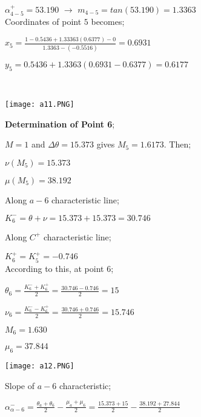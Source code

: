 \begin{appendices}
\begin{minipage}{0.65\textwidth}
${\alpha}_{4-5}^{+} = 53.190 $ $\rightarrow$ $m_{4-5} = tan(53.190) = 1.3363$\\

Coordinates of point $5$ becomes;\\

{\color{magenta}
	$x_5 = \frac{1-0.5436+1.33363(0.6377)-0}{1.3363-(-0.5516)} = 0.6931 $
	
	$y_5 = 0.5436+1.3363(0.6931-0.6377)=0.6177$
}\\
	
\end{minipage}
\begin{minipage}{0.35\textwidth}
	\texttt{[image: a11.PNG]}
\end{minipage}%
\noindent

\noindent\textbf{Determination of Point 6};\\

\begin{minipage}{0.65\textwidth}
	
	$M=1$ and $\Delta\theta = 15.373$ gives $M_5=1.6173$. Then;
	
	$\nu(M_5)=15.373$
	
	$\mu(M_5)=38.192$
	
	Along $a-6$ characteristic line;
	
	$K_6^- = \theta + \nu = 15.373 + 15.373 = 30.746$
	
	Along $C^+$ characteristic line;
	
	$K_6^+ = K_5^+ = -0.746$\\
	
	According to this, at point $6$;
	
	$\theta_6 = \frac{K_6^-+K_6^+}{2} = \frac{30.746-0.746}{2} = 15$
	
	$\nu_6 = \frac{K_6^--K_6^+}{2} = \frac{30.746+0.746}{2} = 15.746$
	
	$M_6 = 1.630$
	
	$\mu_6 = 37.844$\\
	
\end{minipage}
\begin{minipage}{0.35\textwidth}
	\texttt{[image: a12.PNG]}
\end{minipage}%
\noindent

Slope of $a-6$ characteristic;

${\alpha}^{-}_{\alpha-6} = \frac{\theta_a+\theta_6}{2}-\frac{\mu_a+\mu_6}{2} = \frac{15.373+15}{2}-\frac{38.192+27.844}{2}$


\end{appendices}
